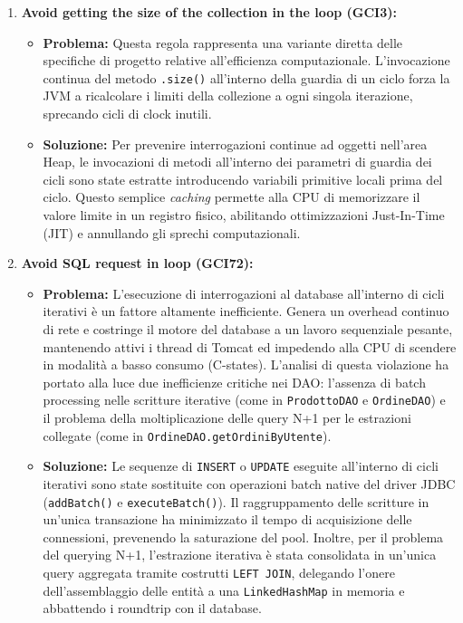 \begin{enumerate}
    \item \textbf{Avoid getting the size of the collection in the loop (GCI3):}
    \begin{itemize}
        \item \textbf{Problema:} Questa regola rappresenta una variante diretta delle specifiche di progetto relative all'efficienza computazionale. L'invocazione continua del metodo \texttt{.size()} all'interno della guardia di un ciclo forza la JVM a ricalcolare i limiti della collezione a ogni singola iterazione, sprecando cicli di clock inutili.
        \item \textbf{Soluzione:} Per prevenire interrogazioni continue ad oggetti nell'area Heap, le invocazioni di metodi all'interno dei parametri di guardia dei cicli sono state estratte introducendo variabili primitive locali prima del ciclo. Questo semplice \textit{caching} permette alla CPU di memorizzare il valore limite in un registro fisico, abilitando ottimizzazioni Just-In-Time (JIT) e annullando gli sprechi computazionali.
    \end{itemize}
    
    \item \textbf{Avoid SQL request in loop (GCI72):}
    \begin{itemize}
        \item \textbf{Problema:} L'esecuzione di interrogazioni al database all'interno di cicli iterativi è un fattore altamente inefficiente. Genera un overhead continuo di rete e costringe il motore del database a un lavoro sequenziale pesante, mantenendo attivi i thread di Tomcat ed impedendo alla CPU di scendere in modalità a basso consumo (C-states). L'analisi di questa violazione ha portato alla luce due inefficienze critiche nei DAO: l'assenza di batch processing nelle scritture iterative (come in \texttt{ProdottoDAO} e \texttt{OrdineDAO}) e il problema della moltiplicazione delle query N+1 per le estrazioni collegate (come in \texttt{OrdineDAO.getOrdiniByUtente}).
        \item \textbf{Soluzione:} Le sequenze di \texttt{INSERT} o \texttt{UPDATE} eseguite all'interno di cicli iterativi sono state sostituite con operazioni batch native del driver JDBC (\texttt{addBatch()} e \texttt{executeBatch()}). Il raggruppamento delle scritture in un'unica transazione ha minimizzato il tempo di acquisizione delle connessioni, prevenendo la saturazione del pool. Inoltre, per il problema del querying N+1, l'estrazione iterativa è stata consolidata in un'unica query aggregata tramite costrutti \texttt{LEFT JOIN}, delegando l'onere dell'assemblaggio delle entità a una \texttt{LinkedHashMap} in memoria e abbattendo i roundtrip con il database.
    \end{itemize}
    

\end{enumerate}
